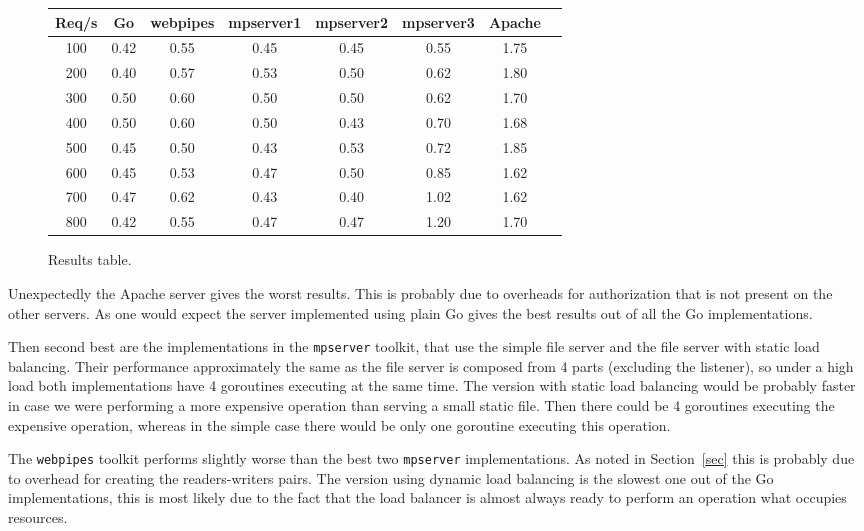 \begin{figure}[h]
\begin{center}
\begin{tabular}{|c|c|c|c|c|c|c|c|}
\hline
Req/s & Go & webpipes & mpserver1 & mpserver2 & mpserver3 & Apache\\
\hline
100 & 0.42 & 0.55 & 0.45 & 0.45 & 0.55 & 1.75 \\
200 & 0.40 & 0.57 & 0.53 & 0.50 & 0.62 & 1.80 \\
300 & 0.50 & 0.60 & 0.50 & 0.50 & 0.62 & 1.70 \\
400 & 0.50 & 0.60 & 0.50 & 0.43 & 0.70 & 1.68 \\
500 & 0.45 & 0.50 & 0.43 & 0.53 & 0.72 & 1.85 \\
600 & 0.45 & 0.53 & 0.47 & 0.50 & 0.85 & 1.62 \\
700 & 0.47 & 0.62 & 0.43 & 0.40 & 1.02 & 1.62 \\
800 & 0.42 & 0.55 & 0.47 & 0.47 & 1.20 & 1.70 \\
\hline
\end{tabular}
\end{center}
\caption{Results table.}
\label{results}
\end{figure}

Unexpectedly the Apache server gives the worst results. This is probably due to 
overheads for authorization that is not present on the other servers. As one would expect
the server implemented using plain Go gives the best results out of all the Go
implementations. 

Then second best are the implementations in the \texttt{mpserver}
toolkit, that use the simple file server and the file server with static load 
balancing. Their performance approximately the same as the file server is composed from 
4 parts (excluding the listener), so under a high load both implementations 
have 4 goroutines executing at the same time. The version with static load balancing
would be probably faster in case we were performing a more expensive operation than serving
a small static file. Then there could be 4 goroutines executing the expensive
operation, whereas in the simple case there would be only one goroutine 
executing this operation.

The \texttt{webpipes} toolkit performs slightly worse than the best two
\texttt{mpserver} implementations. As noted in Section~\ref{sec} this is probably
due to overhead for creating the readers-writers pairs.
The version using dynamic load balancing is the slowest one out of the Go implementations, 
this is most likely due to the fact that the load balancer is almost always ready to perform
an operation what occupies resources.

